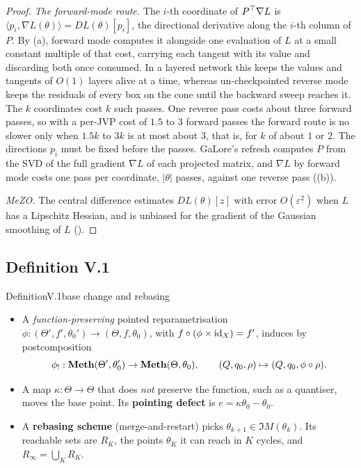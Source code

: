 \begin{proof}
\emph{The forward-mode route.} The $i$-th coordinate of $P^{\top}\nabla L$ is $\langle p_i,\nabla L(\theta)\rangle=DL(\theta)[p_i]$,
the directional derivative along the $i$-th column of $P$. By (a), forward mode computes it alongside one
evaluation of $L$ at a small constant multiple of that cost, carrying each tangent with its value and discarding both once
consumed. In a layered network this keeps the values and tangents of $O(1)$ layers alive at a time, whereas un-checkpointed
reverse mode keeps the residuals of every box on the cone until the backward sweep reaches it. The $k$ coordinates cost
$k$ such passes. One reverse pass costs about three forward passes, so with a per-JVP cost of $1.5$ to $3$ forward passes the
forward route is no slower only when $1.5k$ to $3k$ is at most about $3$, that is, for $k$ of about $1$ or $2$. The
directions $p_i$ must be fixed before the passes. GaLore's refresh computes $P$ from the SVD of the full gradient $\nabla L$
of each projected matrix, and $\nabla L$ by forward mode costs one pass per coordinate, $\lvert\theta\rvert$ passes, against
one reverse pass ((b)).

\emph{MeZO.} The central difference estimates $DL(\theta)[z]$ with error $O(\varepsilon^2)$ when $L$ has a Lipschitz
Hessian, and is unbiased for the gradient of the Gaussian smoothing of $L$ ().
\end{proof}

\subsection{Definition V.1}\label{proof:V.1}

\begin{restate}{Definition}{V.1}{base change and rebasing}
\begin{itemize}
  \item[(a)] A \emph{function-preserving} pointed reparametrisation $\phi:(\Theta',f',\theta_0')\to(\Theta,f,\theta_0)$,
  with $f\circ(\phi\times\mathrm{id}_X)=f'$, induces by postcomposition
  \[\phi_!:\mathbf{Meth}(\Theta',\theta_0')\to\mathbf{Meth}(\Theta,\theta_0),\qquad(Q,q_0,\rho)\mapsto(Q,q_0,\phi\circ\rho).\]
  \item[(b)] A map $\kappa:\Theta\to\Theta$ that does \emph{not} preserve the function, such as a quantiser, moves the
  base point. Its \textbf{pointing defect} is $e=\kappa\theta_0-\theta_0$.
  \item[(c)] A \textbf{rebasing scheme} (merge-and-restart) picks $\theta_{k+1}\in\Im M(\theta_k)$. Its reachable sets
  are $R_K$, the points $\theta_K$ it can reach in $K$ cycles, and $R_\infty=\bigcup_KR_K$.
\end{itemize}
\end{restate}

